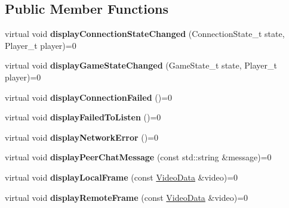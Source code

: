 \subsection*{Public Member Functions}
\begin{DoxyCompactItemize}
\item 
\hypertarget{classUserInterface_a80c9af3149653a9fcca77994ff921520}{
virtual void {\bfseries displayConnectionStateChanged} (ConnectionState\_\-t state, Player\_\-t player)=0}
\label{classUserInterface_a80c9af3149653a9fcca77994ff921520}

\item 
\hypertarget{classUserInterface_aea6b02914ae2d7ffe561189d7c7c7802}{
virtual void {\bfseries displayGameStateChanged} (GameState\_\-t state, Player\_\-t player)=0}
\label{classUserInterface_aea6b02914ae2d7ffe561189d7c7c7802}

\item 
\hypertarget{classUserInterface_aa5d1fd621af37b9d57269ea57ea1470a}{
virtual void {\bfseries displayConnectionFailed} ()=0}
\label{classUserInterface_aa5d1fd621af37b9d57269ea57ea1470a}

\item 
\hypertarget{classUserInterface_a62d5eb6ee2406546e588dcd640e50b9d}{
virtual void {\bfseries displayFailedToListen} ()=0}
\label{classUserInterface_a62d5eb6ee2406546e588dcd640e50b9d}

\item 
\hypertarget{classUserInterface_a4dfc4010db770d8be0a7a9dd4d9eaa98}{
virtual void {\bfseries displayNetworkError} ()=0}
\label{classUserInterface_a4dfc4010db770d8be0a7a9dd4d9eaa98}

\item 
\hypertarget{classUserInterface_aa88e0b9f1ca62c294de672b5104f4592}{
virtual void {\bfseries displayPeerChatMessage} (const std::string \&message)=0}
\label{classUserInterface_aa88e0b9f1ca62c294de672b5104f4592}

\item 
\hypertarget{classUserInterface_aa8ca05eacdd98bba205f549c2bbc739c}{
virtual void {\bfseries displayLocalFrame} (const \hyperlink{structVideoData}{VideoData} \&video)=0}
\label{classUserInterface_aa8ca05eacdd98bba205f549c2bbc739c}

\item 
\hypertarget{classUserInterface_ac3afeafc97a2bad45b124975a24cb633}{
virtual void {\bfseries displayRemoteFrame} (const \hyperlink{structVideoData}{VideoData} \&video)=0}
\label{classUserInterface_ac3afeafc97a2bad45b124975a24cb633}


\end{DoxyCompactItemize}
